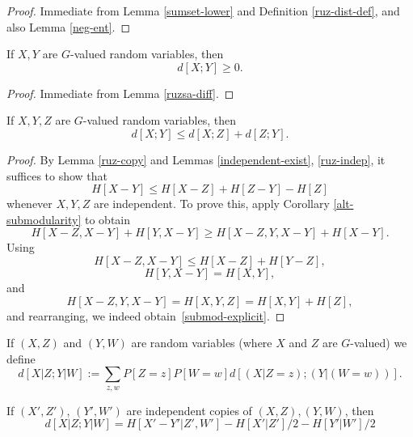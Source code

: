\begin{proof}  Immediate from Lemma \ref{sumset-lower} and Definition \ref{ruz-dist-def}, and also Lemma \ref{neg-ent}.
\end{proof}

\begin{lemma}\label{ruzsa-nonneg}
  If $X,Y$ are $G$-valued random variables, then
  $$ d[X;Y] \geq 0.$$
\end{lemma}

\begin{proof}  Immediate from Lemma \ref{ruzsa-diff}.
\end{proof}

\begin{lemma}\label{ruzsa-triangle}
  If $X,Y,Z$ are $G$-valued random variables, then
$$ d[X;Y] \leq d[X;Z] + d[Z;Y].$$
\end{lemma}

\begin{proof} By Lemma \ref{ruz-copy} and Lemmas \ref{independent-exist}, \ref{ruz-indep}, it suffices to show that
\begin{equation}\label{submod-explicit} H[X - Y] \leq H[X-Z] + H[Z-Y] - H[Z]\end{equation}
whenever $X, Y, Z$ are independent. To prove this, apply Corollary \ref{alt-submodularity} to obtain
\[ H[X - Z, X - Y] + H[Y, X - Y] \geq H[X - Z, Y, X - Y] + H[X - Y].\]
Using
\[ H[X - Z, X - Y] \leq H[X - Z] + H[Y - Z],\]
\[ H[Y, X - Y] = H[X, Y], \] and
\[ H[X - Z, Y, X - Y] = H[X, Y, Z] = H[X, Y] + H[Z],\] and rearranging, we indeed obtain~\eqref{submod-explicit}.
\end{proof}

\begin{definition}\label{cond-dist-def}
If $(X, Z)$ and $(Y, W)$ are random variables (where $X$ and $Z$ are $G$-valued) we define
$$ d[X  | Z; Y | W] := \sum_{z,w} P[Z=z] P[W=w] d[(X|Z=z); (Y|(W=w))].$$
\end{definition}

\begin{lemma}\label{cond-dist-alt}
  If $(X',Z')$, $(Y',W')$ are independent copies of $(X,Z), (Y,W)$, then
$$  d[X  | Z;Y | W] = H[X'-Y'|Z',W'] - H[X'|Z']/2 - H[Y'|W']/2$$
\end{lemma}

